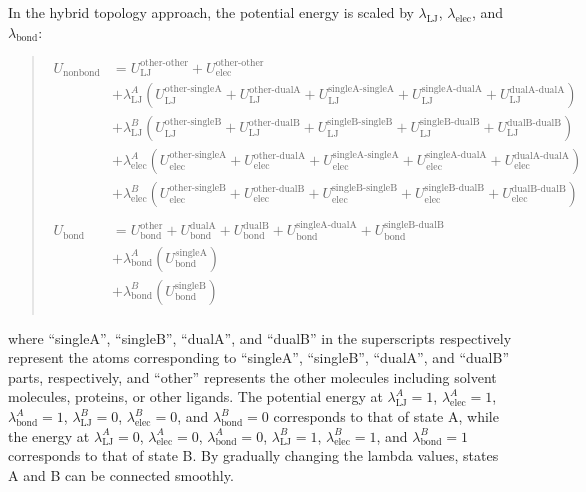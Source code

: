 \documentclass[a4paper,11pt,oneside,english]{sphinxmanual}
\begin{document}
In the hybrid topology approach, the potential energy is scaled by \(\lambda_{\text{LJ}}\), \(\lambda_{\text{elec}}\), and \(\lambda_{\text{bond}}\):
\begin{quote}

\vspace{-5mm}
\begin{equation*}
\begin{split}U_{\text{nonbond}} &= U_{\text{LJ}}^{\text{other-other}} + U_{\text{elec}}^{\text{other-other}} \\
    & + \lambda_{\text{LJ}}^A (U_{\text{LJ}}^{\text{other-singleA}} + U_{\text{LJ}}^{\text{other-dualA}} + U_{\text{LJ}}^{\text{singleA-singleA}} + U_{\text{LJ}}^{\text{singleA-dualA}} + U_{\text{LJ}}^{\text{dualA-dualA}}) \\
    & + \lambda_{\text{LJ}}^B (U_{\text{LJ}}^{\text{other-singleB}} + U_{\text{LJ}}^{\text{other-dualB}} + U_{\text{LJ}}^{\text{singleB-singleB}} + U_{\text{LJ}}^{\text{singleB-dualB}} + U_{\text{LJ}}^{\text{dualB-dualB}}) \\
    & + \lambda_{\text{elec}}^A (U_{\text{elec}}^{\text{other-singleA}} + U_{\text{elec}}^{\text{other-dualA}} + U_{\text{elec}}^{\text{singleA-singleA}} + U_{\text{elec}}^{\text{singleA-dualA}} + U_{\text{elec}}^{\text{dualA-dualA}}) \\
    & + \lambda_{\text{elec}}^B (U_{\text{elec}}^{\text{other-singleB}} + U_{\text{elec}}^{\text{other-dualB}} + U_{\text{elec}}^{\text{singleB-singleB}} + U_{\text{elec}}^{\text{singleB-dualB}} + U_{\text{elec}}^{\text{dualB-dualB}}) \\
\\
U_{\text{bond}} &= U_{\text{bond}}^{\text{other}} + U_{\text{bond}}^{\text{dualA}} + U_{\text{bond}}^{\text{dualB}} + U_{\text{bond}}^{\text{singleA-dualA}} + U_{\text{bond}}^{\text{singleB-dualB}} \\
    & + \lambda_{\text{bond}}^A (U_{\text{bond}}^{s\text{ingleA}}) \\
    & + \lambda_{\text{bond}}^B (U_{\text{bond}}^{\text{singleB}}) \\\end{split}
\end{equation*}
\vspace{-3mm}
\end{quote}

where “singleA”, “singleB”, “dualA”, and “dualB” in the superscripts respectively represent the atoms corresponding to “singleA”, “singleB”, “dualA”, and “dualB” parts, respectively, and “other” represents the other molecules including solvent molecules, proteins, or other ligands.
The potential energy at \(\lambda_{\text{LJ}}^{A}=1\), \(\lambda_{\text{elec}}^{A}=1\), \(\lambda_{\text{bond}}^{A}=1\), \(\lambda_{\text{LJ}}^{B}=0\), \(\lambda_{\text{elec}}^{B}=0\), and \(\lambda_{\text{bond}}^{B}=0\) corresponds to that of state A,
while the energy at \(\lambda_{\text{LJ}}^{A}=0\), \(\lambda_{\text{elec}}^{A}=0\), \(\lambda_{\text{bond}}^{A}=0\), \(\lambda_{\text{LJ}}^{B}=1\), \(\lambda_{\text{elec}}^{B}=1\), and \(\lambda_{\text{bond}}^{B}=1\) corresponds to that of state B.
By gradually changing the lambda values, states A and B can be connected smoothly.
\end{document}
